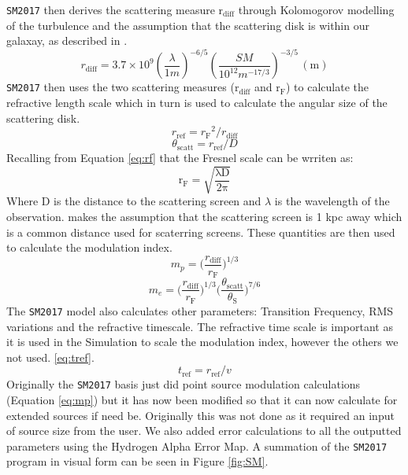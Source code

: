 \documentclass[a4paper]{article}
\def\rf{{\ensuremath{r_{\mathrm{F}}}}}
\def\rref{{\ensuremath{r_{\mathrm{ref}}}}}
\def\rdiff{{\ensuremath{r_{\mathrm{diff}}}}}
\def\tscatt{{\ensuremath{\theta_{\mathrm{scatt}}}}}
\begin{document}
\texttt{SM2017} then derives the scattering measure $\mathrm{r_{diff}}$ through Kolomogorov modelling of the turbulence and the assumption that the scattering disk is within our galaxay, as described in \citet{JP}.
\begin{equation}
\rdiff = 3.7\times 10^9 \left(\frac{\lambda}{1m}\right)^{-6/5} \left(\frac{SM}{10^{12} m^{-17/3}}\right)^{-3/5}\, (\mathrm{m})
\end{equation}
\texttt{SM2017} then uses the two scattering measures ($\mathrm{r_{diff}}$ and $\mathrm{r_{F}}$) to calculate the refractive length scale which in turn is used to calculate the angular size of the scattering disk. 
\begin{equation}
    \rref = \rf^2 / \rdiff
\end{equation}
\begin{equation}
    \tscatt = \rref / D 
\end{equation}
Recalling from Equation \ref{eq:rf} that the Fresnel scale can be wrriten as:
\[\mathrm{
r_F=\sqrt{\dfrac{\lambda D}{2 \pi}}
}\]
Where D is the distance to the scattering screen and $\lambda$ is the wavelength of the observation.  makes the assumption that the scattering screen is 1 kpc away which is a common distance used for scaterring screens. These quantities are then used to calculate the modulation index.
\begin{equation}\label{eq:mp}
   m_p=\bigg(\dfrac{r_{\mathrm{diff}}}{r_{\mathrm{F}}}\bigg)^{1/3}
\end{equation}
\begin{equation}\label{eq:me}
   m_e=\bigg(\dfrac{r_{\mathrm{diff}}}{r_{\mathrm{F}}}\bigg)^{1/3}\bigg(\dfrac{\theta_{\mathrm{scatt}}}{\theta_\mathrm{S}}\bigg)^{7/6}
\end{equation}
The \texttt{SM2017} model also calculates other parameters: Transition Frequency, RMS variations and the refractive timescale. The refractive time scale is important as it is used in the Simulation to scale the modulation index, however the others we not used.
\ref{eq:tref}.
\begin{equation}\label{eq:tref}
    t_\mathrm{ref} = \rref / v
\end{equation}
Originally the \texttt{SM2017} basis just did point source modulation calculations (Equation \ref{eq:mp}) but it has now been modified so that it can now calculate for extended sources if need be. Originally this was not done as it required an input of source size from the user. We also added error calculations to all the outputted parameters using the Hydrogen Alpha Error Map. A summation of the \texttt{SM2017} program in visual form can be seen in Figure \ref{fig:SM}.
\end{document}
